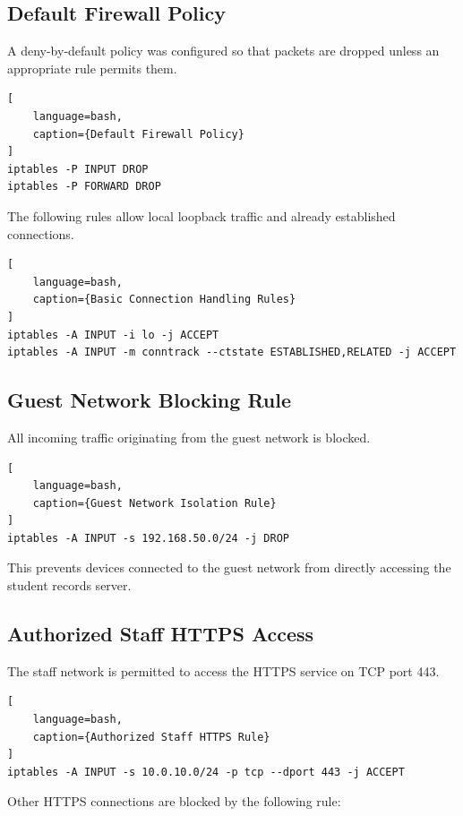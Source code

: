 \documentclass[12pt,a4paper]{article}
\begin{document}
\subsection{Default Firewall Policy}

A deny-by-default policy was configured so that packets are dropped unless an appropriate rule permits them.

\begin{lstlisting}[
    language=bash,
    caption={Default Firewall Policy}
]
iptables -P INPUT DROP
iptables -P FORWARD DROP
\end{lstlisting}

The following rules allow local loopback traffic and already established connections.

\begin{lstlisting}[
    language=bash,
    caption={Basic Connection Handling Rules}
]
iptables -A INPUT -i lo -j ACCEPT
iptables -A INPUT -m conntrack --ctstate ESTABLISHED,RELATED -j ACCEPT
\end{lstlisting}

\subsection{Guest Network Blocking Rule}

All incoming traffic originating from the guest network is blocked.

\begin{lstlisting}[
    language=bash,
    caption={Guest Network Isolation Rule}
]
iptables -A INPUT -s 192.168.50.0/24 -j DROP
\end{lstlisting}

This prevents devices connected to the guest network from directly accessing the student records server.

\subsection{Authorized Staff HTTPS Access}

The staff network is permitted to access the HTTPS service on TCP port 443.

\begin{lstlisting}[
    language=bash,
    caption={Authorized Staff HTTPS Rule}
]
iptables -A INPUT -s 10.0.10.0/24 -p tcp --dport 443 -j ACCEPT
\end{lstlisting}

Other HTTPS connections are blocked by the following rule:
\end{document}
